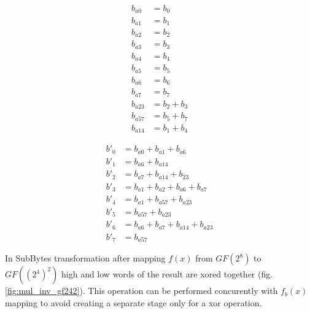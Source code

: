 \begin{figure}[!h]
\begin{multicols}{2}

\begin{equation}
\label{eq:mul_delta_a}
\begin{aligned}
b_{a0}    &= b_0                    \\
b_{a1}    &= b_1                    \\
b_{a2}    &= b_2                    \\
b_{a3}    &= b_3                    \\
b_{a4}    &= b_4                    \\
b_{a5}    &= b_5                    \\
b_{a6}    &= b_6                    \\
b_{a7}    &= b_7                    \\
b_{a23}   &= b_2 + b_3              \\
b_{a57}   &= b_5 + b_7              \\
b_{a14}   &= b_1 + b_4                
\end{aligned}
\end{equation}

\break
 
\begin{equation}
\label{eq:mul_delta_b}
\begin{aligned}
b'_0 &= b_{a0} + b_{a1} + b_{a6}           \\
b'_1 &= b_{a6} + b_{a14}                   \\
b'_2 &= b_{a7} + b_{a14} + b_{23}          \\
b'_3 &= b_{a1} + b_{a2} + b_{a6} + b_{a7}  \\
b'_4 &= b_{a1} + b_{a57} + b_{a23}         \\
b'_5 &= b_{a57} + b_{a23}                  \\
b'_6 &= b_{a6} + b_{a7} + b_{a14} + b_{a23}\\
b'_7 &= b_{a57}                            
\end{aligned}
\end{equation}

\end{multicols}
\end{figure}

\newpage
In SubBytes transformation after mapping $f(x)$ from $GF(2^8)$ to $GF((2^4)^2)$ high and low words of the result are xored together (fig. \ref{fig:mul_inv_gf242}). This operation can be performed concurently with $f_b(x)$ mapping to avoid creating a separate stage only for a xor operation.

